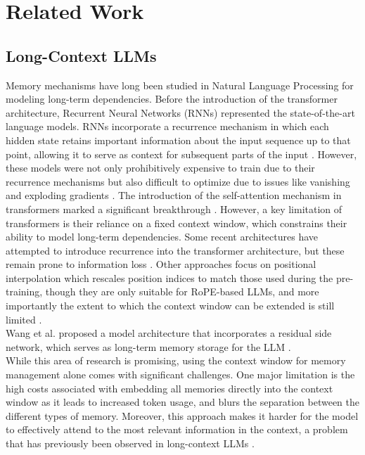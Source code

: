 \cleardoublepage
\chapter{Related Work}
\label{ch:relatedwork}
\label{ch:chapter2}

\section{Long-Context LLMs}

Memory mechanisms have long been studied in Natural Language Processing for modeling long-term dependencies. Before the introduction of the transformer architecture, Recurrent Neural Networks (RNNs) represented the state-of-the-art language models. RNNs incorporate a recurrence mechanism in which each hidden state retains important information about the input sequence up to that point, allowing it to serve as context for subsequent parts of the input \cite{alma991005389998907681}. However, these models were not only prohibitively expensive to train due to their recurrence mechanisms but also difficult to optimize due to issues like vanishing and exploding gradients \cite{dai-etal-2019-transformer}. The introduction of the self-attention mechanism in transformers marked a significant breakthrough \cite{10.5555/3295222.3295349}. However, a key limitation of transformers is their reliance on a fixed context window, which constrains their ability to model long-term dependencies. Some recent architectures have attempted to introduce recurrence into the transformer architecture, but these remain prone to information loss \cite{dai-etal-2019-transformer}. Other approaches focus on positional interpolation which rescales position indices to match those used during the pre-training, though they are only suitable for RoPE-based LLMs, and more importantly the extent to which the context window can be extended is still limited \cite{chen2023extendingcontextwindowlarge}\cite{ding2024longrope}. \\

\noindent Wang et al. proposed a model architecture that incorporates a residual side network, which serves as long-term memory storage for the LLM \cite{wang2023augmentinglanguagemodelslongterm}.\\

\noindent While this area of research is promising, using the context window for memory management alone comes with significant challenges. One major limitation is the high costs associated with embedding all memories directly into the context window as it leads to increased token usage, and blurs the separation between the different types of memory. Moreover, this approach makes it harder for the model to effectively attend to the most relevant information in the context, a problem that has previously been observed in long-context LLMs \cite{liu2023lostmiddlelanguagemodels}.

